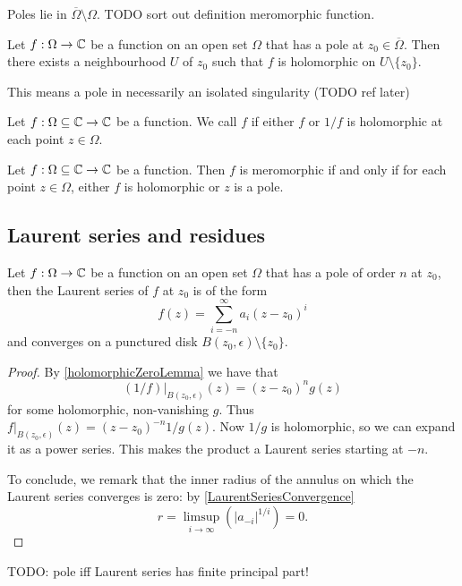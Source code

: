 Poles lie in $\overline{\Omega}\setminus\Omega$. TODO sort out definition meromorphic function.

\begin{lemma}
Let $f:\Omega\to \mathbb{C}$ be a function on an open set $\Omega$ that has a pole at $z_0\in \overline{\Omega}$. Then there exists a neighbourhood $U$ of $z_0$ such that $f$ is holomorphic on $U\setminus\{z_0\}$.
\end{lemma}
This means a pole in necessarily an isolated singularity (TODO ref later)

\begin{definition}
Let $f: \Omega\subseteq \mathbb{C} \to \mathbb{C}$ be a function. We call $f$  if either $f$ or $1/f$ is holomorphic at each point $z\in \Omega$.
\end{definition}

\begin{lemma}
Let $f: \Omega\subseteq \mathbb{C} \to \mathbb{C}$ be a function. Then $f$ is meromorphic \textup{if and only if} for each point $z\in \Omega$, either $f$ is holomorphic or $z$ is a pole.
\end{lemma}

\subsection{Laurent series and residues}
\begin{proposition}
Let $f:\Omega\to \mathbb{C}$ be a function on an open set $\Omega$ that has a pole of order $n$ at $z_0$, then the Laurent series of $f$ at $z_0$ is of the form
\[  f(z) = \sum_{i=-n}^\infty a_i(z-z_0)^i \]
and converges on a punctured disk $B(z_0, \epsilon)\setminus\{z_0\}$.
\end{proposition}
\begin{proof}
By \ref{holomorphicZeroLemma} we have that 
\[ (1/f)|_{B(z_0,\epsilon)}(z) = (z-z_0)^ng(z) \]
for some holomorphic, non-vanishing $g$. Thus $f|_{B(z_0,\epsilon)}(z) = (z-z_0)^{-n}1/g(z)$. Now $1/g$ is holomorphic, so we can expand it as a power series. This makes the product a Laurent series starting at $-n$.

To conclude, we remark that the inner radius of the annulus on which the Laurent series converges is zero: by \ref{LaurentSeriesConvergence}
\[ r = \limsup_{i\to\infty}\left(|a_{-i}|^{1/i}\right) = 0. \]
\end{proof}
TODO: pole iff Laurent series has finite principal part!

